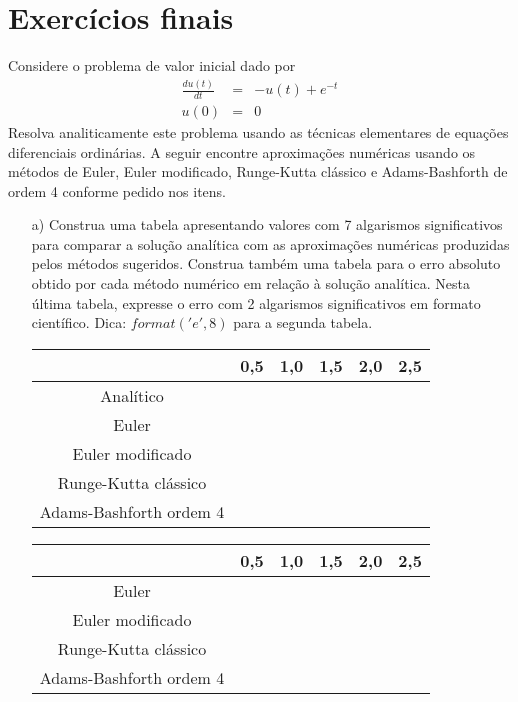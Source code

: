 \emconstrucao

 
 
\section*{Exercícios finais}


\begin{exer} Considere o problema de valor inicial dado por
\begin{eqnarray*}
\frac{d u(t)}{dt} &=& -u(t) + e^{-t} \\
u(0)&=&0
\end{eqnarray*}
Resolva analiticamente este problema usando as técnicas elementares de equações diferenciais ordinárias. A seguir encontre aproximações numéricas usando os métodos de Euler, Euler modificado, Runge-Kutta clássico e Adams-Bashforth de ordem 4 conforme pedido nos itens.
\begin{itemize}
\item[a)]  Construa uma tabela apresentando valores com 7 algarismos significativos para comparar a solução analítica com as aproximações numéricas produzidas pelos métodos sugeridos. Construa também uma tabela para o erro absoluto obtido por cada método numérico em relação à solução analítica. Nesta última tabela, expresse o erro com 2 algarismos significativos em formato científico. Dica: $format('e',8)$ para a segunda tabela.
\begin{center}
\begin{tabular}{|c|c|c|c|c|c|}
\hline
&0,5&1,0&1,5&2,0&2,5\\
\hline
Analítico&&&&&\\
\hline
Euler&&&&&\\
\hline
Euler modificado&&&&&\\
\hline
Runge-Kutta clássico&&&&&\\
\hline
Adams-Bashforth ordem 4&&&&&\\
\hline
\end{tabular} 
\end{center}

\begin{center}
\begin{tabular}{|c|c|c|c|c|c|}
\hline
&0,5&1,0&1,5&2,0&2,5\\
\hline
Euler&&&&&\\
\hline
Euler modificado&&&&&\\
\hline
Runge-Kutta clássico&&&&&\\
\hline
Adams-Bashforth ordem 4&&&&&\\
\hline
\end{tabular}
\end{center}


\end{itemize}
\end{exer}
